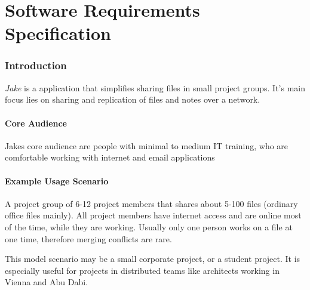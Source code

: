 \part{Software Requirements Specification}

\section{Introduction}
\emph{Jake} is a application that simplifies sharing files in small project groups. It's main focus lies on sharing and replication of files and notes over a network.

\subsection{Core Audience}
Jakes core audience are people with minimal to medium IT training, who are comfortable working with internet and email applications

\subsection{Example Usage Scenario}
A project group of 6-12 project members that shares about 5-100 files (ordinary office files mainly). All project members have internet access and are online most of the time, while they are working. Usually only one person works on a file at one time, therefore merging conflicts are rare.

This model scenario may be a small corporate project, or a student project. It is especially useful for projects in distributed teams like architects working in Vienna and Abu Dabi.

